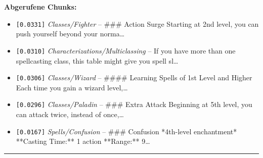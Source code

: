 \noindent\textbf{Abgerufene Chunks:}
\begin{itemize}[noitemsep, topsep=2pt]
  \item[\textbf{\#1}] \texttt{[0.0331]} \textit{Classes/Fighter} -- \#\#\# Action Surge  Starting at 2nd level, you can push yourself beyond your norma\ldots
  \item[\textbf{\#2}] \texttt{[0.0310]} \textit{Characterizations/Multiclassing} -- If you have more than one spellcasting class, this table might give you spell sl\ldots
  \item[\textbf{\#3}] \texttt{[0.0306]} \textit{Classes/Wizard} -- \#\#\#\# Learning Spells of 1st Level and Higher  Each time you gain a wizard level,\ldots
  \item[\textbf{\#4}] \texttt{[0.0296]} \textit{Classes/Paladin} -- \#\#\# Extra Attack  Beginning at 5th level, you can attack twice, instead of once,\ldots
  \item[\textbf{\#5}] \texttt{[0.0167]} \textit{Spells/Confusion} -- \#\#\# Confusion  *4th-level enchantment*  **Casting Time:** 1 action  **Range:** 9\ldots
\end{itemize}
\vspace{4pt}
\hrule
\vspace{6pt}
